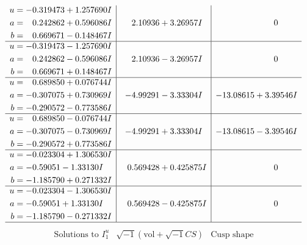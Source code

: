 \documentclass[1p]{elsarticle_modified}
\theoremstyle{definition}
\newcommand{\I}{\sqrt{-1}}
\begin{document}
$$\begin{array}{c|c|c}
\begin{aligned}
u &= -0.319473 + 1.257690 I \\
a &= \phantom{-}0.242862 + 0.596086 I \\
b &= \phantom{-}0.669671 - 0.148467 I\end{aligned}
 & \phantom{-}2.10936 + 3.26957 I & \phantom{-0.000000 } 0 \\ \hline\begin{aligned}
u &= -0.319473 - 1.257690 I \\
a &= \phantom{-}0.242862 - 0.596086 I \\
b &= \phantom{-}0.669671 + 0.148467 I\end{aligned}
 & \phantom{-}2.10936 - 3.26957 I & \phantom{-0.000000 } 0 \\ \hline\begin{aligned}
u &= \phantom{-}0.689850 + 0.076744 I \\
a &= -0.307075 + 0.730969 I \\
b &= -0.290572 - 0.773586 I\end{aligned}
 & -4.99291 - 3.33304 I & -13.08615 + 3.39546 I \\ \hline\begin{aligned}
u &= \phantom{-}0.689850 - 0.076744 I \\
a &= -0.307075 - 0.730969 I \\
b &= -0.290572 + 0.773586 I\end{aligned}
 & -4.99291 + 3.33304 I & -13.08615 - 3.39546 I \\ \hline\begin{aligned}
u &= -0.023304 + 1.306530 I \\
a &= -0.59051 - 1.33130 I \\
b &= -1.185790 + 0.271332 I\end{aligned}
 & \phantom{-}0.569428 + 0.425875 I & \phantom{-0.000000 } 0 \\ \hline\begin{aligned}
u &= -0.023304 - 1.306530 I \\
a &= -0.59051 + 1.33130 I \\
b &= -1.185790 - 0.271332 I\end{aligned}
 & \phantom{-}0.569428 - 0.425875 I & \phantom{-0.000000 } 0\\
 \hline 
 \end{array}$$\newpage$$\begin{array}{c|c|c}  
\text{Solutions to }I^u_{1}& \I (\text{vol} + \sqrt{-1}CS) & \text{Cusp shape}\\
 \hline 
\begin{aligned}

\end{aligned}
\end{array}$$
\end{document}
